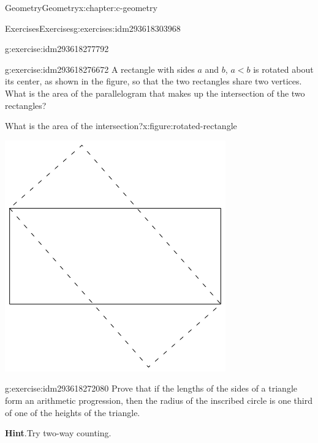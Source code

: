 \documentclass[twoside,10pt,]{book}
\newcommand{\blocktitlefont}{\relax}
\numberwithin{equation}{section}
\newcommand{\lt}{<}
\begin{document}
\begin{chapterptx}{Geometry}{}{Geometry}{}{}{x:chapter:c-geometry}
\begin{exercises-section}{Exercises}{}{Exercises}{}{}{g:exercises:idm293618303968}
\begin{divisionexercise}{3}{}{}{g:exercise:idm293618277792}
\end{divisionexercise}%
\begin{divisionexercise}{4}{}{}{g:exercise:idm293618276672}%
A rectangle with sides \(a\) and \(b\), \(a \lt b\) is rotated about its center, as shown in the figure, so that the two rectangles share two vertices. What is the area of the parallelogram that makes up the intersection of the two rectangles?%
\begin{figureptx}{What is the area of the intersection?}{x:figure:rotated-rectangle}{}%
\begin{image}{0.2}{0.6}{0.2}%
\includegraphics[width=\linewidth]{images/rotated-rectangle.png}
\end{image}%
\tcblower
\end{figureptx}%
\end{divisionexercise}%
\begin{divisionexercise}{5}{}{}{g:exercise:idm293618272080}%
Prove that if the lengths of the sides of a triangle form an arithmetic progression, then the radius of the inscribed circle is one third of one of the heights of the triangle.%
\par\smallskip%
\noindent\textbf{\blocktitlefont Hint}.\label{g:hint:idm293618268176}{}\hypertarget{g:hint:idm293618268176}{}\quad{}Try two-way counting.%
\end{divisionexercise}%

\end{exercises-section}
\end{chapterptx}
\end{document}
